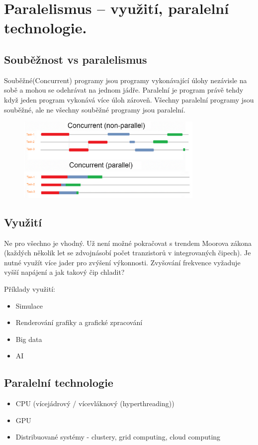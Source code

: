 \section{Paralelismus – využití, paralelní technologie.}
\subsection{Souběžnost vs paralelismus}
Souběžné(Concurrent) programy jsou programy vykonávající úlohy nezávisle na sobě a mohou se odehrávat na jednom jádře.
Paralelní je program právě tehdy když jeden program vykonává více úloh zároveň. Všechny paralelní programy jsou 
souběžné, ale ne všechny souběžné programy jsou paralelní.

\begin{figure}
    \centering
    \includegraphics[width=0.8\textwidth]{pict/concurrency.png}
\end{figure}

\subsection{Využití}
Ne pro všechno je vhodný. Už není možné pokračovat s trendem Moorova zákona (každých několik let se zdvojnásobí počet tranzistorů
v integrovaných čipech). Je nutné využít více jader pro zvýšení výkonnosti. Zvyšování frekvence vyžaduje vyšší napájení a jak 
takový čip chladit?

Příklady využití: 
\begin{itemize}
    \item Simulace
    \item Renderování grafiky a grafické zpracování
    \item Big data
    \item AI
\end{itemize}

\subsection{Paralelní technologie}
\begin{itemize}
    \item CPU (vícejádrový / vícevláknový (hyperthreading))
    \item GPU
    \item Distribuované systémy - clustery, grid computing, cloud computing
\end{itemize}

